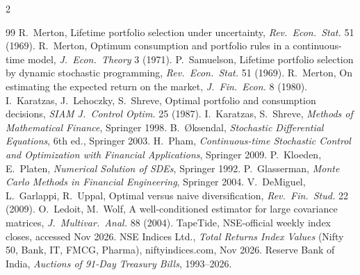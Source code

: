 \documentclass[10pt,a4paper]{article}
\begin{document}
\begin{multicols}{2}
\begin{thebibliography}{99}\footnotesize\setlength{\itemsep}{-1pt}
 R.\ Merton, Lifetime portfolio selection under uncertainty, \emph{Rev.\ Econ.\ Stat.} 51 (1969).
 R.\ Merton, Optimum consumption and portfolio rules in a continuous-time model, \emph{J.\ Econ.\ Theory} 3 (1971).
 P.\ Samuelson, Lifetime portfolio selection by dynamic stochastic programming, \emph{Rev.\ Econ.\ Stat.} 51 (1969).
 R.\ Merton, On estimating the expected return on the market, \emph{J.\ Fin.\ Econ.} 8 (1980).
 I.\ Karatzas, J.\ Lehoczky, S.\ Shreve, Optimal portfolio and consumption decisions, \emph{SIAM J.\ Control Optim.} 25 (1987).
 I.\ Karatzas, S.\ Shreve, \emph{Methods of Mathematical Finance}, Springer 1998.
 B.\ {\O}ksendal, \emph{Stochastic Differential Equations}, 6th ed., Springer 2003.
 H.\ Pham, \emph{Continuous-time Stochastic Control and Optimization with Financial Applications}, Springer 2009.
 P.\ Kloeden, E.\ Platen, \emph{Numerical Solution of SDEs}, Springer 1992.
 P.\ Glasserman, \emph{Monte Carlo Methods in Financial Engineering}, Springer 2004.
 V.\ DeMiguel, L.\ Garlappi, R.\ Uppal, Optimal versus naive diversification, \emph{Rev.\ Fin.\ Stud.} 22 (2009).
 O.\ Ledoit, M.\ Wolf, A well-conditioned estimator for large covariance matrices, \emph{J.\ Multivar.\ Anal.} 88 (2004).
 TapeTide, NSE-official weekly index closes, accessed Nov 2026.
 NSE Indices Ltd., \emph{Total Returns Index Values} (Nifty 50, Bank, IT, FMCG, Pharma), niftyindices.com, Nov 2026.
 Reserve Bank of India, \emph{Auctions of 91-Day Treasury Bills}, 1993--2026.
\end{thebibliography}
\end{multicols}
\end{document}

